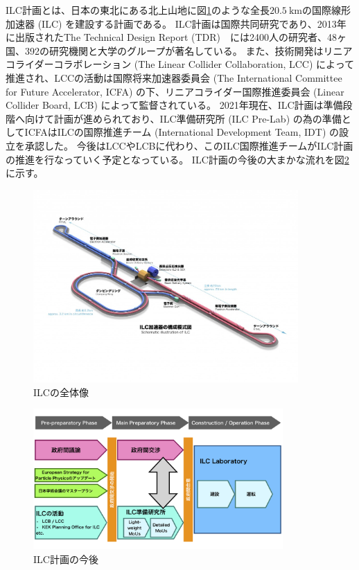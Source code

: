 ILC計画とは、日本の東北にある北上山地に図\ref{2InternationalLinearCollider}のような全長$20.5\ \mathrm{km}$の国際線形加速器 (ILC) を建設する計画である。
ILC計画は国際共同研究であり、2013年に出版されたThe Technical Design Report (TDR\cite{ILCTDRVES})　には2400人の研究者、48ヶ国、392の研究機関と大学のグループが著名している。
また、技術開発はリニアコライダーコラボレーション (The Linear Collider Collaboration, LCC) によって推進され、LCCの活動は国際将来加速器委員会 (The International Committee for Future Accelerator, ICFA) の下、リニアコライダー国際推進委員会 (Linear Collider Board, LCB) によって監督されている。
2021年現在、ILC計画は準備段階へ向けて計画が進められており、ILC準備研究所 (ILC Pre-Lab) の為の準備としてICFAはILCの国際推進チーム (International Development Team, IDT) の設立を承認した。
今後はLCCやLCBに代わり、このILC国際推進チームがILC計画の推進を行なっていく予定となっている。
ILC計画の今後の大まかな流れを図\ref{3ILCProject}に示す。

\begin{figure}[htbp]
 \centering
  \includegraphics[trim = 0 100 0 100, width=0.9\textwidth, clip]{Figure/1Introduction/2InternationalLinearCollider.jpg}
  \caption[ILCの全体像]
                 {ILCの全体像\cite{ILCPHOTO}}
  \label{2InternationalLinearCollider}
\end{figure}

\begin{figure}[htbp]
 \centering
 \includegraphics[width=0.85\textwidth]{Figure/1Introduction/3ILCProject.png}
 \caption[ILC計画の今後]
                {ILC計画の今後\cite{RecommendationsonILCProjectImplementation}}
 \label{3ILCProject}
\end{figure}


